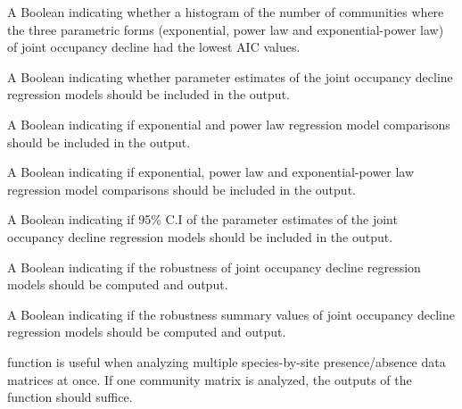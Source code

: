 \documentclass[a4paper]{book}
\begin{document}
\begin{Arguments}
\begin{ldescription}
\item[\code{param\_hist}] A Boolean indicating whether a histogram of the number of communities where the
three parametric forms (exponential, power law and exponential-power law) of joint occupancy
decline had the lowest AIC values.

\item[\code{params}] A Boolean indicating whether parameter estimates of the joint occupancy decline
regression models should be included in the output.

\item[\code{best.mod2}] A Boolean indicating if exponential and power law regression model comparisons
should be included in the output.

\item[\code{best.mod3}] A Boolean indicating if exponential, power law and exponential-power law
regression model comparisons should be included in the output.

\item[\code{params\_c.i}] A Boolean indicating if 95\% C.I of the parameter estimates of the joint occupancy
decline regression models should be included in the output.

\item[\code{my.r2}] A Boolean indicating if the robustness of joint occupancy decline regression models
should be computed and output.

\item[\code{my.r2.s}] A Boolean indicating if the robustness summary values of joint occupancy decline
regression models should be computed and output.
\end{ldescription}
\end{Arguments}
%
\begin{Details}\relax
{} function is useful when analyzing multiple species-by-site presence/absence
data matrices at once. If one community matrix is analyzed, the outputs of the function
 should suffice.
\end{Details}
%
\end{document}
